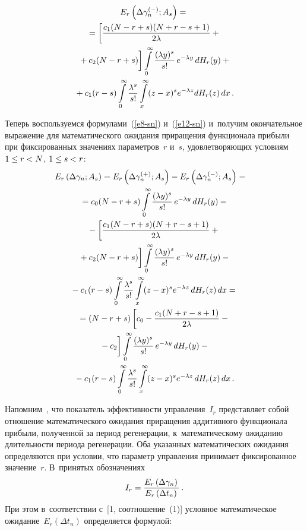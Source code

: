 \begin{multicols}{2}
\noindent
  \begin{multline}
  E_r\left(\Delta\gamma_n^{(-)};A_s\right) ={}\\
  {}=\left[ 
  \fr{c_1(N-r+s)(N+r-s+1)} {2\lambda} +{}\right.
\\
\left.  {}+c_2(N-r+s)
\vphantom{  \fr{c_1(N-r+s)(N+r-s+1)} {2\lambda}}
\right] \int\limits_0^\infty 
\fr{(\lambda y)^s}{s!}\,e^{-\lambda y} \,d H_r(y)+{}\\
  {}+ c_1(r-s) \int\limits_0^\infty \fr{\lambda^s}{s!} \int\limits_x^{\infty} (z-x)^s 
e^{-\lambda z} dH_r(z)\,dx\,.
  \label{e12-sn}
  \end{multline}
  
  Теперь воспользуемся формулами~(\ref{e8-sn}) и~(\ref{e12-sn}) и~получим 
окончательное выражение для математического ожидания приращения 
функционала прибыли при фиксированных значениях па\-ра\-мет\-ров~$r$ и~$s$, 
удовле\-тво\-ря\-ющих условиям $1\hm\leq r\hm<N$, $1\hm\leq s\hm<r$:
  \begin{multline}
  \hspace*{-6.91103pt}E_r\left( \Delta\gamma_n;A_s\right) = E_r \left( 
\Delta\gamma_n^{(+)};A_s\right)- E_r\left(\Delta 
\gamma_n^{(-)};A_s\right)={}\\
  {}=c_0(N-r+s)\int\limits_0^\infty \fr{(\lambda y)^s}{s!}\,e^{-\lambda y}\, dH_r(y)-
{}\\
  {}-
  \left[ \fr{c_1(N-r+s)(N+r-s+1)}{2\lambda}+ {}\right.\\
\left.  {}+c_2(N-r+s)
\vphantom{\fr{c_1(N-r+s)(N+r-s+1)}{2\lambda}}
\right] \int\limits_0^\infty 
\fr{(\lambda y)^s}{s!}\,e^{-\lambda y}\, dH_r(y)
  -{}\\
  {}- c_1(r-s) \int\limits_0^\infty \fr{\lambda^s}{s!} \int\limits_x^\infty (z-x)^s e^{-
\lambda z} \,dH_r(z)\,dx={}\\
  {}=
  (N-r+s) \left[ c_0 -\fr{c_1(N+r-s+1)}{2\lambda} -{}\right.\\
\left.  {}-c_2
\vphantom{\fr{c_1(N+r-s+1)}{2\lambda}}
\right]  \int\limits_0^\infty 
  \fr{(\lambda y)^s}{s!}\,e^{-\lambda y} \,dH_r(y) -{}\\
{}-c_1(r-s)
  \int\limits_0^\infty \fr{\lambda^s}{s!}\int\limits_x^\infty (z-x)^s e^{-\lambda z} 
\,dH_r(z)\,dx\,.
\label{e13-sn}
  \end{multline}
  
  Напомним~\cite{1-sn}, что показатель эффективности управ\-ле\-ния~$I_r$ 
представляет собой отношение математического ожидания приращения 
аддитивного функционала прибыли, полученной за период регенерации, 
к~математическому ожиданию дли\-тель\-ности периода регенерации. Оба 
указанных математических ожидания определяются при условии, что параметр 
управ\-ле\-ния принимает фиксированное значение~$r$.  В~принятых 
обозначениях
  \begin{equation}
  I_r=\displaystyle\frac{\displaystyle E_r\left(\Delta\gamma_n\right)\mathstrut}{\displaystyle E_r\left( \Delta t_n\right)\mathstrut}\,.
  \label{e14-sn}
  \end{equation}
%  
  При этом в~соответствии с~[1, соотношение~(1)] условное 
математическое ожидание~$E_r(\Delta t_n)$ определяется формулой:


\end{multicols}
